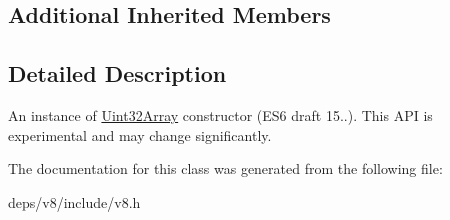 \subsection*{Additional Inherited Members}


\subsection{Detailed Description}
An instance of \hyperlink{classv8_1_1_uint32_array}{Uint32\+Array} constructor (E\+S6 draft 15..). This A\+P\+I is experimental and may change significantly. 

The documentation for this class was generated from the following file\+:\begin{DoxyCompactItemize}
\item 
deps/v8/include/v8.\+h\end{DoxyCompactItemize}
